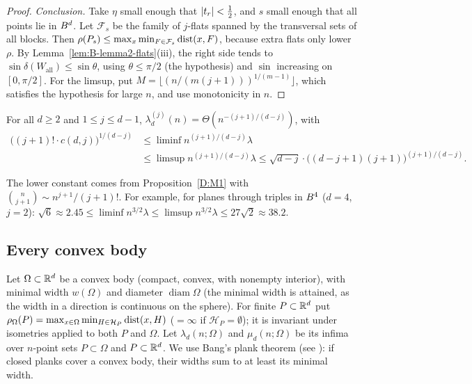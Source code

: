 \documentclass[11pt]{article}
\begin{document}
\begin{proof}
\emph{Conclusion.} Take $\eta$ small enough that $\left|t_r\right|<\frac12$, and $s$ small enough that all
points lie in $B^d$. Let $\mathcal{F}_s$ be the family of $j$-flats spanned by the transversal
sets of all blocks. Then $\rho(P_s)\le\max_x\min_{F\in\mathcal{F}_s}\operatorname{dist}(x,F)$, because extra flats
only lower $\rho$. By Lemma~\ref{lem:B-lemma2-flats}(iii), the right side tends to
$\sin\delta(W_{\mathrm{all}})\le\sin\theta$, using $\theta\le\pi/2$ (the hypothesis) and $\sin$
increasing on $[0,\pi/2]$. For the limsup, put
$M=\bigl\lfloor(n/(m(j+1)))^{1/(m-1)}\bigr\rfloor$, which satisfies the hypothesis for large $n$, and
use monotonicity in $n$.
\end{proof}

\begin{corollary}\label{D:M4}
For all $d\ge2$ and $1\le j\le d-1$, $\lambda_d^{(j)}(n)=\Theta(n^{-(j+1)/(d-j)})$, with
\begin{align*}
  \bigl((j+1)!\cdot c(d,j)\bigr)^{1/(d-j)}&\le\liminf n^{(j+1)/(d-j)}\lambda\\
  &\le\limsup n^{(j+1)/(d-j)}\lambda\le\sqrt{d-j}\cdot\bigl((d-j+1)(j+1)\bigr)^{(j+1)/(d-j)}.
\end{align*}
\end{corollary}

The lower constant comes from Proposition~\ref{D:M1} with $\binom{n}{j+1}\sim n^{j+1}/(j+1)!$. For
example, for planes through triples in $B^4$ ($d=4$, $j=2$):
$\sqrt6\approx2.45\le\liminf n^{3/2}\lambda\le\limsup n^{3/2}\lambda\le27\sqrt2\approx38.2$.

\subsection{Every convex body}\label{sec:D-convex}\label{sec:convex}

Let $\Omega\subset\mathbb{R}^d$ be a convex body (compact, convex, with nonempty interior), with minimal width $w(\Omega)$ and
diameter $\operatorname{diam}\Omega$ (the minimal width is attained, as the width in a direction is continuous on the
sphere). For finite $P\subset\mathbb{R}^d$ put $\rho_\Omega(P)=\max_{x\in\Omega}\min_{H\in\mathcal H_P}\operatorname{dist}(x,H)$ ($=\infty$ if
$\mathcal H_P=\emptyset$); it is invariant under isometries applied to both $P$ and $\Omega$. Let
$\lambda_d(n;\Omega)$ and $\mu_d(n;\Omega)$ be its infima over $n$-point sets $P\subset\Omega$ and $P\subset\mathbb{R}^d$. We use Bang's
plank theorem \cite{Bang} (see \cite[Theorem~2.2]{Verreault}): if closed planks cover a convex body, their widths sum
to at least its minimal width.
\end{document}
